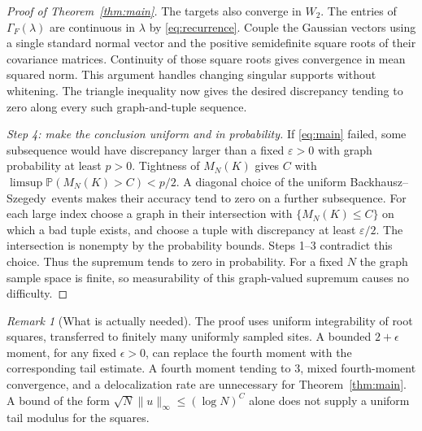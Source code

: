 \documentclass[11pt]{article}
\numberwithin{equation}{section}
\theoremstyle{definition}
\theoremstyle{remark}
\newtheorem{remark}[theorem]{Remark}
\newcommand{\PP}{\mathbb P}
\newcommand{\Ga}{\Gamma}
\newcommand{\BS}{Backhausz--Szegedy}
\begin{document}
\begin{proof}[Proof of Theorem~\ref{thm:main}]
The targets also converge in $W_2$. The entries of $\Ga_F(\lambda)$
are continuous in $\lambda$ by \eqref{eq:recurrence}. Couple the Gaussian
vectors using a single standard normal vector and the positive
semidefinite square roots of their covariance matrices. Continuity
of those square roots gives convergence in mean squared norm.
This argument handles changing singular supports without whitening.
The triangle inequality now gives the desired discrepancy tending to
zero along every such graph-and-tuple sequence.

\emph{Step 4: make the conclusion uniform and in probability.}
If \eqref{eq:main} failed, some subsequence would have discrepancy
larger than a fixed $\varepsilon>0$ with graph probability at least
$p>0$. Tightness of $M_N(K)$ gives $C$ with
$\limsup\PP(M_N(K)>C)<p/2$. A diagonal choice of the uniform
\BS\ events makes their accuracy tend to zero on a further
subsequence. For each large index choose a graph in their intersection
with $\{M_N(K)\leq C\}$ on which a bad tuple exists, and choose a tuple
with discrepancy at least $\varepsilon/2$. The intersection is nonempty
by the probability bounds. Steps 1--3 contradict this choice.
Thus the supremum tends to zero in probability. For a fixed $N$ the
graph sample space is finite, so measurability of this graph-valued
supremum causes no difficulty.
\end{proof}

\begin{remark}[What is actually needed]
The proof uses uniform integrability of root squares, transferred to
finitely many uniformly sampled sites. A bounded $2+\epsilon$ moment,
for any fixed $\epsilon>0$, can replace the fourth moment with the
corresponding tail estimate. A fourth moment tending to $3$, mixed
fourth-moment convergence, and a delocalization rate are unnecessary
for Theorem~\ref{thm:main}. A bound of the form
$\sqrt N\|u\|_\infty\leq(\log N)^C$ alone does not supply a uniform
tail modulus for the squares.
\end{remark}
\end{document}

